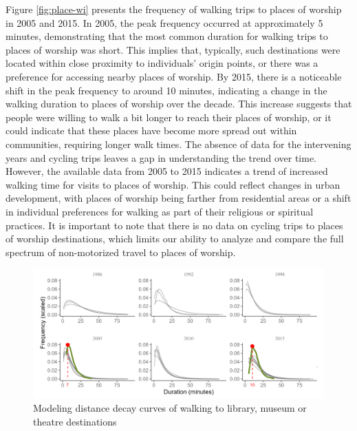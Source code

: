 \documentclass[
11pt, %
oneside, %
english, %
singlespacing, %
]{macthesis} %
\begin{document}
Figure \ref{fig:place-wi} presents the frequency of walking trips to places of worship in 2005 and 2015. In 2005, the peak frequency occurred at approximately 5 minutes, demonstrating that the most common duration for walking trips to places of worship was short. This implies that, typically, such destinations were located within close proximity to individuals' origin points, or there was a preference for accessing nearby places of worship. By 2015, there is a noticeable shift in the peak frequency to around 10 minutes, indicating a change in the walking duration to places of worship over the decade. This increase suggests that people were willing to walk a bit longer to reach their places of worship, or it could indicate that these places have become more spread out within communities, requiring longer walk times. The absence of data for the intervening years and cycling trips leaves a gap in understanding the trend over time. However, the available data from 2005 to 2015 indicates a trend of increased walking time for visits to places of worship. This could reflect changes in urban development, with places of worship being farther from residential areas or a shift in individual preferences for walking as part of their religious or spiritual practices. It is important to note that there is no data on cycling trips to places of worship destinations, which limits our ability to analyze and compare the full spectrum of non-motorized travel to places of worship.

\newpage
\thispagestyle{empty}
\begin{landscape}

\begin{figure}

{\centering \includegraphics[width=0.9\linewidth]{figure/ch03-Fig16} 

}

\caption{Modeling distance decay curves of walking to library, museum or theatre destinations}\label{fig:library-wi}
\end{figure}

\end{landscape}
\clearpage
\end{document}
